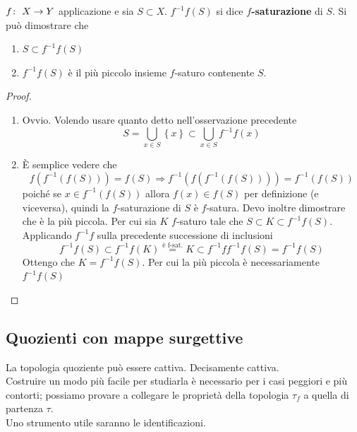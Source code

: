 \begin{theorem}
	$f \colon\ X \rightarrow Y$ applicazione e sia $S \subset X$. $f^{-1}f(S)$ si dice \textbf{$f$-saturazione} di $S$. Si può dimostrare che 
	\begin{enumerate}
		\item $S \subset f^{-1}f(S)$
		\item $f^{-1}f(S)$ è il più piccolo insieme $f$-saturo contenente $S$.
	\end{enumerate}
\end{theorem}
\begin{proof}
	\begin{enumerate}
		\item Ovvio. Volendo usare quanto detto nell'osservazione precedente
		\begin{equation*}
			S = \bigcup_{x\in S} \left\{x\right\} \subset \bigcup_{x \in S} f^{-1}f(x)
		\end{equation*}
		\item È semplice vedere che
		\begin{equation*}
			f(f^{-1}(f(S))) = f(S) \Longrightarrow f^{-1}(f(f^{-1}(f(S)))) = f^{-1}(f(S))
		\end{equation*}
		poiché se $x \in f^{-1}(f(S))$ allora $f(x) \in f(S)$ per definizione (e viceversa), quindi la $f$-saturazione di $S$ è $f$-satura. Devo inoltre dimostrare che è la più piccola. Per cui sia $K$ $f$-saturo tale che $S \subset K \subset f^{-1}f(S)$. Applicando $f^{-1}f$ sulla precedente successione di inclusioni
		\begin{equation*}
			f^{-1}f(S) \subset f^{-1}f(K) \overset{\text{è f-sat.}}{=} K \subset f^{-1}ff^{-1}f(S) = f^{-1}f(S) 
		\end{equation*}
		Ottengo che $K = f^{-1}f(S)$. Per cui la più piccola è necessariamente $f^{-1}f(S)$ 
	\end{enumerate}
\end{proof}



\subsection{\textcolor{TopGener}{\textbf{Quozienti con mappe surgettive}}}
La topologia quoziente può essere cattiva. Decisamente cattiva. \\
Costruire un modo più facile per studiarla è necessario per i casi peggiori e più contorti; possiamo provare a collegare le proprietà della topologia $\tau_f$ a quella di partenza $\tau$. \\ Uno strumento utile saranno le identificazioni.

